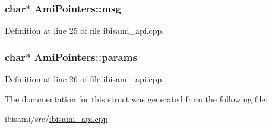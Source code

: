 \hypertarget{struct_ami_pointers_a4922e9e0eb86e7515c5d60a4be512657}{}
\subsubsection[{msg}]{\setlength{\rightskip}{0pt plus 5cm}char$\ast$ Ami\+Pointers\+::msg}\label{struct_ami_pointers_a4922e9e0eb86e7515c5d60a4be512657}


Definition at line 25 of file ibisami\+\_\+api.\+cpp.

\hypertarget{struct_ami_pointers_a4a71183d01dde25a4cb9fabb89ee6d01}{}
\subsubsection[{params}]{\setlength{\rightskip}{0pt plus 5cm}char$\ast$ Ami\+Pointers\+::params}\label{struct_ami_pointers_a4a71183d01dde25a4cb9fabb89ee6d01}


Definition at line 26 of file ibisami\+\_\+api.\+cpp.



The documentation for this struct was generated from the following file\+:\begin{DoxyCompactItemize}
\item 
ibisami/src/\hyperlink{ibisami__api_8cpp}{ibisami\+\_\+api.\+cpp}\end{DoxyCompactItemize}

